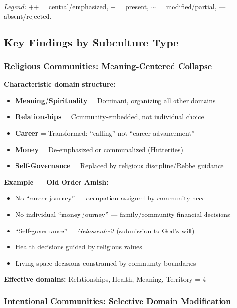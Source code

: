 \textit{Legend:} ++ = central/emphasized, + = present, $\sim$ = modified/partial, — = absent/rejected.

\subsection{Key Findings by Subculture Type}

\subsubsection{Religious Communities: Meaning-Centered Collapse}

\begin{tcolorbox}[colback=blue!5!white, colframe=blue!75!black, title=Pattern: Religious Communities (N$_{\text{eff}}$ = 4-5)]

\textbf{Characteristic domain structure:}
\begin{itemize}[nosep]
\item \textbf{Meaning/Spirituality} = Dominant, organizing all other domains
\item \textbf{Relationships} = Community-embedded, not individual choice
\item \textbf{Career} = Transformed: ``calling'' not ``career advancement''
\item \textbf{Money} = De-emphasized or communalized (Hutterites)
\item \textbf{Self-Governance} = Replaced by religious discipline/Rebbe guidance
\end{itemize}

\textbf{Example --- Old Order Amish:}
\begin{itemize}[nosep]
\item No ``career journey'' --- occupation assigned by community need
\item No individual ``money journey'' --- family/community financial decisions
\item ``Self-governance'' = \textit{Gelassenheit} (submission to God's will)
\item Health decisions guided by religious values
\item Living space decisions constrained by community boundaries
\end{itemize}

\textbf{Effective domains:} Relationships, Health, Meaning, Territory = 4

\end{tcolorbox}

\subsubsection{Intentional Communities: Selective Domain Modification}

